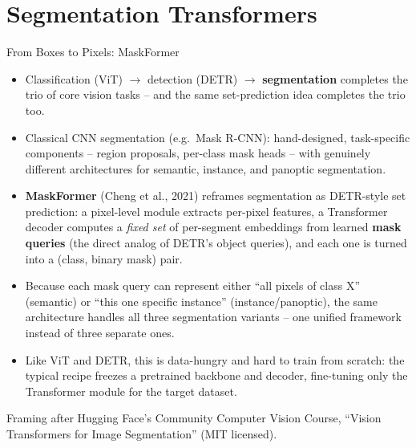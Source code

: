
\section{Segmentation Transformers}

\begin{vbframe}{From Boxes to Pixels: MaskFormer}
\begin{itemize}
  \item Classification (ViT) $\to$ detection (DETR) $\to$ \textbf{segmentation} completes the trio of core vision tasks -- and the same set-prediction idea completes the trio too.
  \item Classical CNN segmentation (e.g.\ Mask R-CNN): hand-designed, task-specific components -- region proposals, per-class mask heads -- with genuinely different architectures for semantic, instance, and panoptic segmentation.
  \item \textbf{MaskFormer} (Cheng et al., 2021) reframes segmentation as DETR-style set prediction: a pixel-level module extracts per-pixel features, a Transformer decoder computes a \emph{fixed set} of per-segment embeddings from learned \textbf{mask queries} (the direct analog of DETR's object queries), and each one is turned into a (class, binary mask) pair.
\end{itemize}

\framebreak

\begin{itemize}
  \item Because each mask query can represent either ``all pixels of class X'' (semantic) or ``this one specific instance'' (instance/panoptic), the same architecture handles all three segmentation variants -- one unified framework instead of three separate ones.
  \item Like ViT and DETR, this is data-hungry and hard to train from scratch: the typical recipe freezes a pretrained backbone and decoder, fine-tuning only the Transformer module for the target dataset.
\end{itemize}
{\footnotesize Framing after Hugging Face's Community Computer Vision Course, \enquote{Vision Transformers for Image Segmentation} (MIT licensed).}
\end{vbframe}

